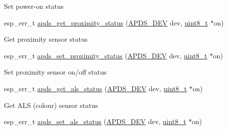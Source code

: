 \begin{DoxyCompactItemize}
\begin{DoxyCompactList}
\begin{DoxyItemize}
\item Set power-\/on status 
\end{DoxyItemize}\end{DoxyCompactList}\item 
esp\+\_\+err\+\_\+t \hyperlink{group__APDS9960__SetStatusFunctions_ga9982b51fc7247fe03068e0e88d9d54af}{apds\+\_\+get\+\_\+proximity\+\_\+status} (\hyperlink{structAPDS9960__Driver}{A\+P\+D\+S\+\_\+\+D\+EV} dev, \hyperlink{vl53l0x__types_8h_aba7bc1797add20fe3efdf37ced1182c5}{uint8\+\_\+t} $\ast$on)
\begin{DoxyCompactList}\small\item\em 
\begin{DoxyItemize}
\item Get proximity sensor status 
\end{DoxyItemize}\end{DoxyCompactList}\item 
esp\+\_\+err\+\_\+t \hyperlink{group__APDS9960__SetStatusFunctions_ga8f7166cfb237b5fca3dfc34f03105c65}{apds\+\_\+set\+\_\+proximity\+\_\+status} (\hyperlink{structAPDS9960__Driver}{A\+P\+D\+S\+\_\+\+D\+EV} dev, \hyperlink{vl53l0x__types_8h_aba7bc1797add20fe3efdf37ced1182c5}{uint8\+\_\+t} $\ast$on)
\begin{DoxyCompactList}\small\item\em 
\begin{DoxyItemize}
\item Set proximity sensor on/off status 
\end{DoxyItemize}\end{DoxyCompactList}\item 
esp\+\_\+err\+\_\+t \hyperlink{group__APDS9960__SetStatusFunctions_gaba6484a7d8a5a7a450cc8c219f797935}{apds\+\_\+get\+\_\+als\+\_\+status} (\hyperlink{structAPDS9960__Driver}{A\+P\+D\+S\+\_\+\+D\+EV} dev, \hyperlink{vl53l0x__types_8h_aba7bc1797add20fe3efdf37ced1182c5}{uint8\+\_\+t} $\ast$on)
\begin{DoxyCompactList}\small\item\em 
\begin{DoxyItemize}
\item Get A\+LS (colour) sensor status 
\end{DoxyItemize}\end{DoxyCompactList}\item 
esp\+\_\+err\+\_\+t \hyperlink{group__APDS9960__SetStatusFunctions_gaaa00dd7cbd113a4b5e93f3842e6b2901}{apds\+\_\+set\+\_\+als\+\_\+status} (\hyperlink{structAPDS9960__Driver}{A\+P\+D\+S\+\_\+\+D\+EV} dev, \hyperlink{vl53l0x__types_8h_aba7bc1797add20fe3efdf37ced1182c5}{uint8\+\_\+t} $\ast$on)

\end{DoxyCompactItemize}
